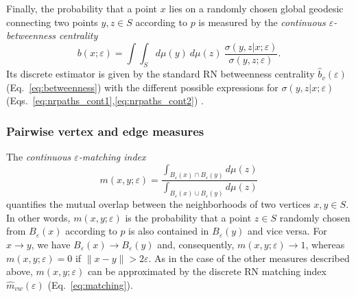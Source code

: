 \documentclass[graybox]{svmult}
\begin{document}
Finally, the probability that a point $x$ lies on a randomly chosen global geodesic connecting two points $y,z\in S$ according to $p$ is measured by the \emph{continuous $\varepsilon$-betweenness centrality}
\begin{equation}
b(x;\varepsilon)=\int\int_S d\mu(y)\ d\mu(z)\ \frac{\sigma(y,z|x;\varepsilon)}{\sigma(y,z;\varepsilon)}.
\end{equation}
\noindent
Its discrete estimator is given by the standard RN betweenness centrality $\hat{b}_v(\varepsilon)$ (Eq.~\ref{eq:betweenness}) with the different possible expressions for $\sigma(y,z|x;\varepsilon)$ (Eqs.~\ref{eq:nrpaths_cont1},\ref{eq:nrpaths_cont2}) \cite{Donges2012PRE}.


\subsubsection{Pairwise vertex and edge measures}

The \emph{continuous $\varepsilon$-matching index}
\begin{equation}
m(x,y;\varepsilon)=\frac{\int_{B_{\varepsilon}(x)\cap B_{\varepsilon}(y)}d\mu(z)}{\int_{B_{\varepsilon}(x)\cup B_{\varepsilon}(y)}d\mu(z)}
\end{equation}
\noindent
quantifies the mutual overlap between the neighborhoods of two vertices $x,y\in S$. In other words, $m(x,y;\varepsilon)$ is the probability that a point $z\in S$ randomly chosen from $B_{\varepsilon}(x)$ according to $p$ is also contained in $B_{\varepsilon}(y)$ and vice versa. For $x\to y$, we have $B_{\varepsilon}(x)\to B_{\varepsilon}(y)$ and, consequently, $m(x,y;\varepsilon)\to 1$, whereas $m(x,y;\varepsilon)=0$ if $\|x-y\|>2\varepsilon$. As in the case of the other measures described above, $m(x,y;\varepsilon)$ can be approximated by the discrete RN matching index $\hat{m}_{vw}(\varepsilon)$ (Eq.~\ref{eq:matching}).
\end{document}
